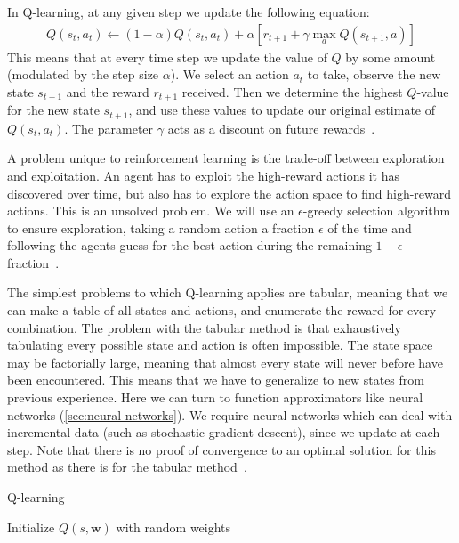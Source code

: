 \documentclass[11pt, a4paper]{report} %
\begin{document}
In Q-learning, at any given step we update the following equation:
\begin{align}
  \label{eq:71}
  Q(s_t,a_t) \leftarrow (1-\alpha) Q(s_t, a_t) + \alpha \left[r_{t+1}+\gamma \max_a Q(s_{t+1},a)\right]
\end{align}
This means that at every time step we update the value of \(Q\) by some amount (modulated by the step size \(\alpha\)).
We select an action \(a_t\) to take, observe the new state \(s_{t+1}\) and the reward \(r_{t+1}\) received.
Then we determine the highest \(Q\)-value for the new state \(s_{t+1}\), and use these values to update our original estimate of \(Q(s_t,a_t)\).
The parameter \(\gamma\) acts as a discount on future rewards~\cite{Sutton}.

A problem unique to reinforcement learning is the trade-off between exploration and exploitation.
An agent has to exploit the high-reward actions it has discovered over time, but also has to explore the action space to find high-reward actions.
This is an unsolved problem.
We will use an $\epsilon$-greedy selection algorithm to ensure exploration, taking a random action a fraction $\epsilon$ of the time and following the agents guess for the best action during the remaining \(1-\epsilon\) fraction~\cite{Sutton}.


The simplest problems to which Q-learning applies are tabular, meaning that we can make a table of all states and actions, and enumerate the reward for every combination.
The problem with the tabular method is that exhaustively tabulating every possible state and action is often impossible.
The state space may be factorially large, meaning that almost every state will never before have been encountered.
This means that we have to generalize to new states from previous experience.
Here we can turn to function approximators like neural networks (\cref{sec:neural-networks}).
We require neural networks which can deal with incremental data (such as stochastic gradient descent), since we update at each step.
Note that there is no proof of convergence to an optimal solution for this method as there is for the tabular method~\cite{watkins92_q_learn,Sutton}.

\begin{algorithm}[H]
  \caption{Q-learning}
  Initialize $Q(s,\mathbf{w})$ with random weights
   \begin{algorithmic}[1]
     \Else{}
     \EndIf{}
     \EndFor{}
     \EndFor{}
  \end{algorithmic}\label{alg:qlearning}
\end{algorithm}
\end{document}
